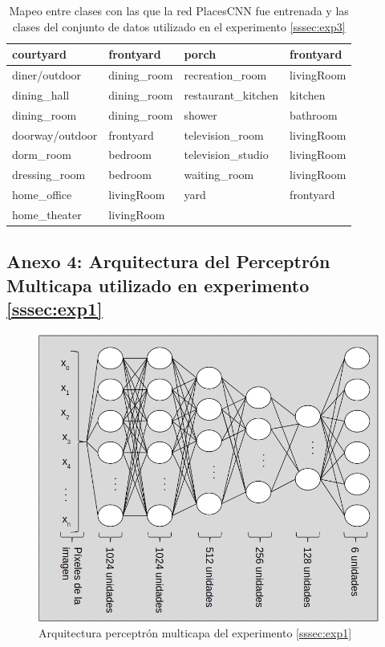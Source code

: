 \begin{table}[h!]
\begin{tabular}{||l|l||l|l||}
		courtyard &    frontyard &               porch &   frontyard \\
		\midrule
		diner/outdoor &  dining\_room &     recreation\_room &  livingRoom \\
		\midrule
		dining\_hall &  dining\_room &  restaurant\_kitchen &     kitchen \\
		\midrule
		dining\_room &  dining\_room &              shower &    bathroom \\
		\midrule
		doorway/outdoor &    frontyard &     television\_room &  livingRoom \\
		\midrule
		dorm\_room &      bedroom &   television\_studio &  livingRoom \\
		\midrule
		dressing\_room &      bedroom &        waiting\_room &  livingRoom \\
		\midrule
		home\_office &   livingRoom &                yard &   frontyard \\
		\midrule
		home\_theater &  livingRoom & & \\
		\bottomrule
	\end{tabular}
	\caption{Mapeo entre clases con las que la red PlacesCNN fue entrenada y las clases del conjunto de datos utilizado en el experimento \ref{sssec:exp3}}
\label{anexo:exp3:mapping}
\end{table}


\subsection{Anexo 4: Arquitectura del Perceptrón Multicapa utilizado en experimento \ref{sssec:exp1}}\label{ssec:anexo4}
\begin{figure}[!htb]
\centering
\includegraphics[width=0.7\linewidth]{images/architecture_exp1}
\caption{Arquitectura perceptrón multicapa del experimento \ref{sssec:exp1}}
\label{fig:architectureexp1}
\end{figure}


